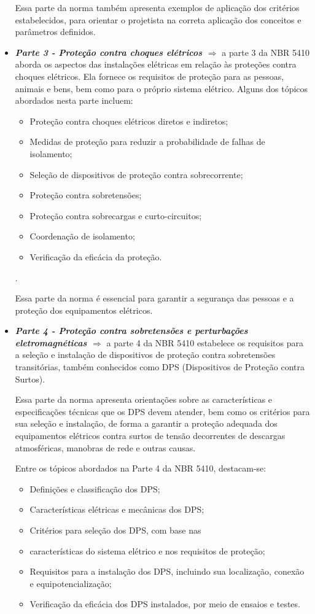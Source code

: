 \documentclass[a4paper, 12pt, onecolumn,singlespacing]{article}
\begin{document}
\begin{itemize}
			
			Essa parte da norma também apresenta exemplos de aplicação dos critérios estabelecidos, para orientar o projetista na correta aplicação dos conceitos e parâmetros definidos.
			\item \textbf{\textit{Parte 3 - Proteção contra choques elétricos $\Rightarrow$ }}a parte 3 da NBR 5410 aborda os aspectos das instalações elétricas em relação às proteções contra choques elétricos. Ela fornece os requisitos de proteção para as pessoas, animais e bens, bem como para o próprio sistema elétrico. Alguns dos tópicos abordados nesta parte incluem:
			\begin{itemize}
				\item Proteção contra choques elétricos diretos e indiretos;
				\item Medidas de proteção para reduzir a probabilidade de falhas de isolamento;
				\item Seleção de dispositivos de proteção contra sobrecorrente;
				\item Proteção contra sobretensões;
				\item Proteção contra sobrecargas e curto-circuitos;
				\item Coordenação de isolamento;
				\item Verificação da eficácia da proteção.
			\end{itemize}
			.
			
			Essa parte da norma é essencial para garantir a segurança das pessoas e a proteção dos equipamentos elétricos.
			\item \textbf{\textit{Parte 4 - Proteção contra sobretensões e perturbações eletromagnéticas $\Rightarrow$ }}a parte 4 da NBR 5410 estabelece os requisitos para a seleção e instalação de dispositivos de proteção contra sobretensões transitórias, também conhecidos como DPS (Dispositivos de Proteção contra Surtos).
			
			Essa parte da norma apresenta orientações sobre as características e especificações técnicas que os DPS devem atender, bem como os critérios para sua seleção e instalação, de forma a garantir a proteção adequada dos equipamentos elétricos contra surtos de tensão decorrentes de descargas atmosféricas, manobras de rede e outras causas.
			
			Entre os tópicos abordados na Parte 4 da NBR 5410, destacam-se:
			\begin{itemize}
				\item Definições e classificação dos DPS;
				\item Características elétricas e mecânicas dos DPS;
				\item Critérios para seleção dos DPS, com base nas \item características do sistema elétrico e nos requisitos de proteção;
				\item Requisitos para a instalação dos DPS, incluindo sua localização, conexão e equipotencialização;
				\item Verificação da eficácia dos DPS instalados, por meio de ensaios e testes.
			\end{itemize}
			

\end{itemize}
\end{document}
